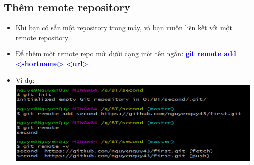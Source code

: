 \documentclass[12pt,a4paper]{report}
\begin{document}
\subsection{Thêm remote repository} 
\begin{itemize}
\item Khi bạn có sẵn một repository trong máy, và bạn muốn liên kết với một remote repository
\item Để thêm một remote repo mới dưới dạng một tên ngắn: \textcolor{blue}{\bf git remote add <shortname> <url>}
\item Ví dụ: 
\vskip 0.4cm
	\includegraphics[width=0.8\linewidth]{screenshot034}
	
	\label{fig:screenshot034}
\end{itemize}
\end{document}
